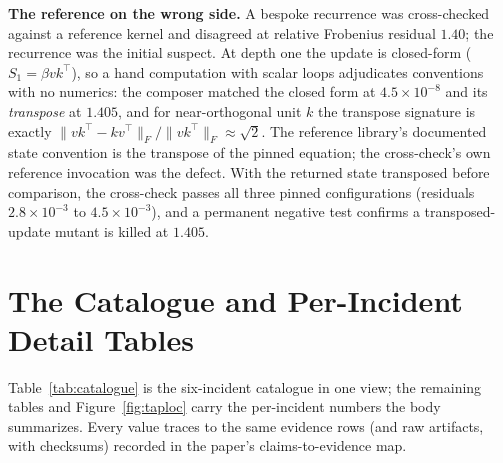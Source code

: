 \textbf{The reference on the wrong side.} A bespoke recurrence was
cross-checked against a reference kernel and disagreed at relative
Frobenius residual $1.40$; the recurrence was the initial suspect. At
depth one the update is closed-form ($S_1=\beta vk^{\top}$), so a hand
computation with scalar loops adjudicates conventions with no
numerics: the composer matched the closed form at $4.5\times10^{-8}$
and its \emph{transpose} at $1.405$, and for near-orthogonal unit $k$
the transpose signature is exactly
$\|vk^{\top}-kv^{\top}\|_F/\|vk^{\top}\|_F\approx\sqrt{2}$. The
reference library's documented state convention is the transpose of
the pinned equation; the cross-check's own reference invocation was
the defect. With the returned state transposed before comparison, the
cross-check passes all three pinned configurations (residuals
$2.8\times10^{-3}$ to $4.5\times10^{-3}$), and a permanent negative
test confirms a transposed-update mutant is killed at $1.405$.

\section{The Catalogue and Per-Incident Detail Tables}
\label{app:tables}

Table~\ref{tab:catalogue} is the six-incident catalogue in one view;
the remaining tables and Figure~\ref{fig:taploc} carry the
per-incident numbers the body summarizes. Every value traces to the
same evidence rows (and raw artifacts, with checksums) recorded in the
paper's claims-to-evidence map.

